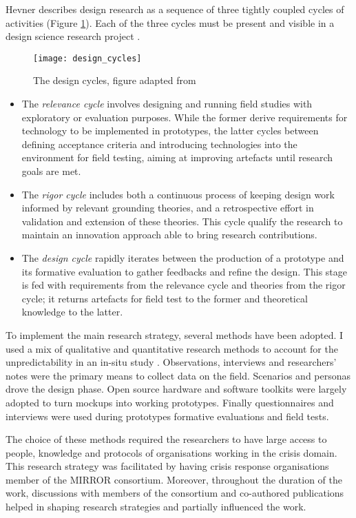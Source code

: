 Hevner \autocites{Havner2004}{hevner2007three} describes design research as a sequence of three tightly coupled cycles of activities (Figure \ref{fig:design-cycles}). Each of the three cycles must be present and visible in a design science research project \autocite{Hevner:2010gc}.
\begin{figure}
	[tbh] \centering 
	\texttt{[image: design\_cycles]} \caption{The design cycles, figure adapted from \protect\autocite{hevner2007three}} \label{fig:design-cycles} 
\end{figure}
\begin{itemize}
	\item The \emph{relevance cycle} involves designing and running field studies with exploratory or evaluation purposes. While the former derive requirements for technology to be implemented in prototypes, the latter cycles between defining acceptance criteria and introducing technologies into the environment for field testing, aiming at improving artefacts until research goals are met. 
	\item The \emph{rigor cycle} includes both a continuous process of keeping design work informed by relevant grounding theories, and a retrospective effort in validation and extension of these theories. This cycle qualify the research to maintain an innovation approach able to bring research contributions. 
	\item The \emph{design cycle} rapidly iterates between the production of a prototype and its formative evaluation to gather feedbacks and refine the design. This stage is fed with requirements from the relevance cycle and theories from the rigor cycle; it returns artefacts for field test to the former and theoretical knowledge to the latter. 
\end{itemize}

To implement the main research strategy, several methods have been adopted. I used a mix of qualitative and quantitative research methods to account for the unpredictability in an in-situ study \autocite{Rogers:2007gv}. Observations, interviews and researchers' notes were the primary means to collect data on the field. Scenarios and personas drove the design phase. Open source hardware and software toolkits were largely adopted to turn mockups into working prototypes. Finally questionnaires and interviews were used during prototypes formative evaluations and field tests.

The choice of these methods required the researchers to have large access to people, knowledge and protocols of organisations working in the crisis domain. This research strategy was facilitated by having crisis response organisations member of the MIRROR consortium. Moreover, throughout the duration of the work, discussions with members of the consortium and co-authored publications helped in shaping research strategies and partially influenced the work.

